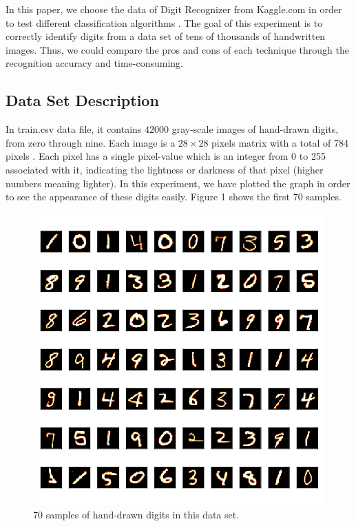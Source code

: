 \documentclass[sigconf]{acmart}
\begin{document}
In this paper, we choose the data of Digit Recognizer from Kaggle.com in order to test different classification algorithms \cite{kaggle}. The goal of this experiment is to correctly identify digits from a data set of tens of thousands of handwritten images. Thus, we could compare the pros and cons of each technique through the recognition accuracy and time-consuming.

\subsection{Data Set Description}

In train.csv data file, it contains $42000$ gray-scale images of hand-drawn digits, from zero through nine. Each image is a $28 \times 28$ pixels matrix with a total of 784 pixels \cite{kaggle}. Each pixel has a single pixel-value which is an integer from 0 to 255 associated with it, indicating the lightness or darkness of that pixel (higher numbers meaning lighter). In this experiment, we have plotted the graph in order to see the appearance of these digits easily. Figure 1 shows the first 70 samples.
\begin{figure}[!ht]
\centering
\includegraphics[]{images/data_samples}
\caption{70 samples of hand-drawn digits in this data set.}
\end{figure}
\end{document}
